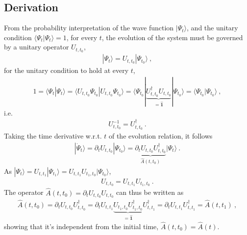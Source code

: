 \documentclass[letterpaper,10pt,english]{jupyterBook}
\begin{document}
\subsection{Derivation}
\label{\detokenize{ch/quantum-mechanics/wave-mechanics:derivation}}
\sphinxAtStartPar
From the probability interpretation of the wave function \(| \Psi_t \rangle\), and the unitary condition \(\langle \Psi_t | \Psi_t \rangle = 1\), for every \(t\), the evolution of the system must be governed by a unitary operator \(U_{t,t_0}\),
\begin{equation*}
\begin{split} | \Psi_t \rangle = U_{t,t_0} | \Psi_{t_0} \rangle \ ,\end{split}
\end{equation*}
\sphinxAtStartPar
for the unitary condition to hold at every \(t\),
\begin{equation*}
\begin{split}1 =  \langle \Psi_{t} | \Psi_{t} \rangle = \langle U_{t,t_0} \Psi_{t_0} |  U_{t,t_0} \Psi_{t_0} \rangle = \langle \Psi_{t_0} | \underbrace{U^{\dagger}_{t,t_0}  U_{t,t_0}}_{= \hat{\mathbf{1}}} | \Psi_{t_0} \rangle =  \langle \Psi_{t_0} | \Psi_{t_0} \rangle \ ,\end{split}
\end{equation*}
\sphinxAtStartPar
i.e.
\begin{equation*}
\begin{split}U_{t,t_0}^{-1} = U^{\dagger}_{t,t_0} \ .\end{split}
\end{equation*}
\sphinxAtStartPar
Taking the time derivative w.r.t. \(t\) of the evolution relation, it follows
\begin{equation*}
\begin{split}| \dot{\Psi}_t \rangle = \partial_t U_{t,t_0} | \Psi_{t_0} \rangle = \underbrace{ \partial_t U_{t,t_0} U^{\dagger}_{t,t_0}}_{ \hat{A}(t,t_0)} | \Psi_{t} \rangle \ .\end{split}
\end{equation*}
\sphinxAtStartPar
{} As \(| \Psi_{t} \rangle = U_{t,t_1} | \Psi_{t_1} \rangle =  U_{t,t_1} U_{t_1,t_0}| \Psi_{t_0} \rangle\),
\begin{equation*}
\begin{split}U_{t,t_0} = U_{t,t_1} U_{t_1,t_0} \ .\end{split}
\end{equation*}
\sphinxAtStartPar
{} The operator \(\hat{A}(t,t_0) = \partial_t U_{t,t_0} U_{t,t_0}\) can thus be written as
\begin{equation*}
\begin{split}\hat{A}(t,t_0) = \partial_t U_{t,t_0} U_{t,t_0}^{\dagger} = \partial_t U_{t,t_1} \underbrace{U_{t_1,t_0} U_{t_1, t_0}^{\dagger}}_{ = \hat{\mathbf{1}} } U_{t,t_1}^{\dagger} = \partial_t U_{t,t_1} U_{t,t_1}^{\dagger} = \hat{A}(t,t_1) \ ,\end{split}
\end{equation*}
\sphinxAtStartPar
showing that it’s independent from the initial time, \(\hat{A}(t,t_0) = \hat{A}(t)\).
\end{document}
